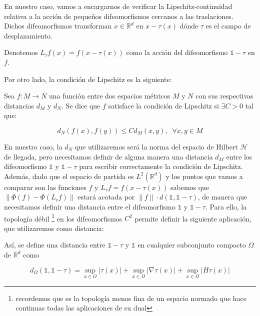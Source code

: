 \noindent En nuestro caso, vamos a encargarnos de verificar la Lipschitz-continuidad relativa a la acción de pequeños difeomorfismos cercanos a las traslaciones. Dichos difeomorfismos transforman $x \in \mathbb{R}^d$ en $x-\tau (x)$ dónde $\tau$ es el campo de desplazamiento. 

\begin{definicion}
Denotemos $L_{\tau} f(x)=f(x-\tau(x))$ como la acción del difeomorfismo $\mathbb{1}-\tau$ en $f$.
\end{definicion} 

\medskip

\noindent Por otro lado, la condición de Lipschitz es la siguiente: 

\begin{definicion}
  Sea $f: M \rightarrow N$ una función entre dos espacios métricos $M$ y $N$ con sus respectivas distancias $d_M$ y $d_N$. Se dice que $f$ satisface la condición de Lipschitz si $\exists C>0$ tal que: 

  $$d_N(f(x),f(y))\leq C d_M(x,y), \; \; \forall x,y \in M$$
\end{definicion}

\noindent En nuestro caso, la $d_N$ que utilizaremos será la norma del espacio de Hilbert $\mathcal{H}$ de llegada, pero necesitamos definir de alguna manera una distancia $d_M$ entre los difeomorfismo $\mathbb{1}$ y $\mathbb{1}-\tau$ para escribir correctamente la condición de Lipschitz. Además, dado que el espacio de partida es $L^2(\mathbb{R}^d)$ y los puntos que vamos a comparar son las funciones $f$ y $L_\tau f=f(x-\tau(x))$ sabemos que $\|\Phi(f) - \Phi(L_cf) \|$ estará acotada por $\|f\| · d(\mathbb{1}, \mathbb{1}-\tau)$, de manera que necesitamos definir una distancia entre el difeomorfismo $\mathbb{1}$ y $\mathbb{1}-\tau$. Para ello, la topología débil \footnote{ recordemos que es la topología menos fina de un espacio normado que hace continuas todas las aplicaciones de su dual} en los difeomorfismos $C^2$  permite definir la siguiente aplicación, que utilizaremos como distancia:

\begin{definicion}
Así, se define una distancia entre $\mathbb{1}-\tau$ y $\mathbb{1}$ en cualquier subconjunto compacto $\Omega$ de $\mathbb{R}^d$ como 

\begin{equation} \label{eq::distancia}
  d_\Omega(\mathbb{1},\mathbb{1}-\tau) = \sup_{x \in \Omega} |\tau (x)| + \sup_{x \in \Omega} |\nabla \tau (x)| + \sup_{x \in \Omega}|H \tau (x)|
\end{equation}

\end{definicion}
\medskip

